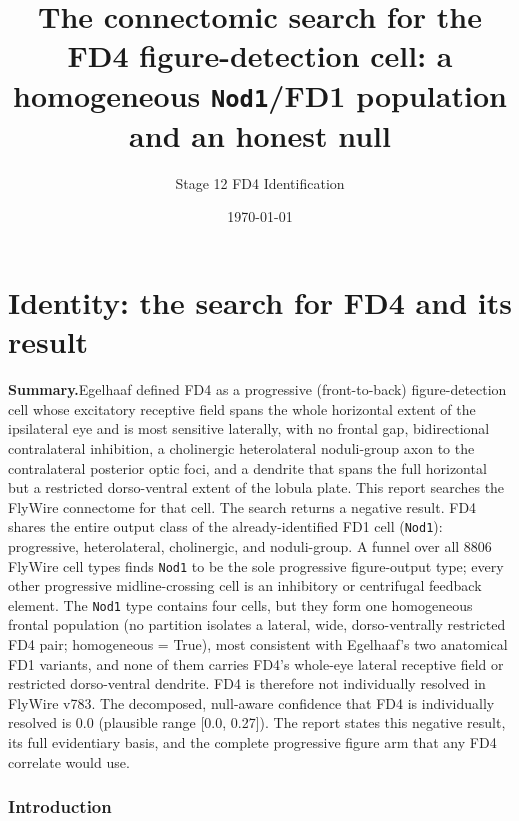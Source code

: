 \documentclass[11pt]{article}
\newcommand{\ttt}[1]{\texttt{#1}}
\begin{document}
\title{\textbf{The connectomic search for the FD4 figure-detection cell: a homogeneous \ttt{Nod1}/FD1 population and an honest null}}

\author{Stage 12 FD4 Identification}

\date{\today}

\maketitle

\tableofcontents

\part{Identity: the search for FD4 and its result}

\textbf{Summary.}\quad Egelhaaf defined FD4 as a progressive (front-to-back) figure-detection cell whose excitatory receptive field spans the whole horizontal extent of the ipsilateral eye and is most sensitive laterally, with no frontal gap, bidirectional contralateral inhibition, a cholinergic heterolateral noduli-group axon to the contralateral posterior optic foci, and a dendrite that spans the full horizontal but a restricted dorso-ventral extent of the lobula plate. This report searches the FlyWire connectome for that cell. The search returns a negative result. FD4 shares the entire output class of the already-identified FD1 cell (\ttt{Nod1}): progressive, heterolateral, cholinergic, and noduli-group. A funnel over all 8806 FlyWire cell types finds \ttt{Nod1} to be the sole progressive figure-output type; every other progressive midline-crossing cell is an inhibitory or centrifugal feedback element. The \ttt{Nod1} type contains four cells, but they form one homogeneous frontal population (no partition isolates a lateral, wide, dorso-ventrally restricted FD4 pair; homogeneous = True), most consistent with Egelhaaf's two anatomical FD1 variants, and none of them carries FD4's whole-eye lateral receptive field or restricted dorso-ventral dendrite. FD4 is therefore not individually resolved in FlyWire v783. The decomposed, null-aware confidence that FD4 is individually resolved is 0.0 (plausible range [0.0, 0.27]). The report states this negative result, its full evidentiary basis, and the complete progressive figure arm that any FD4 correlate would use.

\section{Introduction}
\end{document}
